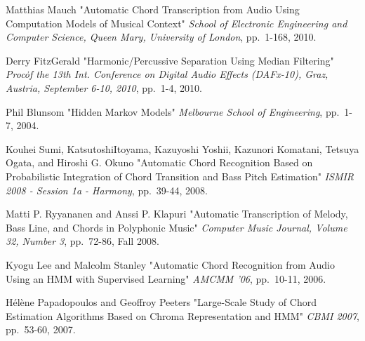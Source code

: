 \documentclass{article}
\begin{document}
\begin{thebibliography}{citations}
Matthias Mauch
"Automatic Chord Transcription from Audio Using Computation Models of Musical Context"
{\it School of Electronic Engineering and Computer Science, Queen Mary, University of London},
pp.~1-168, 2010.

Derry FitzGerald
"Harmonic/Percussive Separation Using Median Filtering"
{\it Proc\. of the 13th Int. Conference on Digital Audio Effects (DAFx-10), Graz, Austria, September 6-10, 2010},
pp.~1-4, 2010.

Phil Blunsom
"Hidden Markov Models"
{\it Melbourne School of Engineering},
pp.~1-7, 2004.

Kouhei Sumi, KatsutoshiItoyama, Kazuyoshi Yoshii, Kazunori Komatani, Tetsuya Ogata, and Hiroshi G. Okuno
"Automatic Chord Recognition Based on Probabilistic Integration of Chord Transition and Bass Pitch Estimation"
{\it ISMIR 2008 - Session 1a - Harmony},
pp.~39-44, 2008.

Matti P. Ryyananen and Anssi P. Klapuri
"Automatic Transcription of Melody, Bass Line, and Chords in Polyphonic Music"
{\it Computer Music Journal, Volume 32, Number 3},
pp.~72-86, Fall 2008.

Kyogu Lee and Malcolm Stanley
"Automatic Chord Recognition from Audio Using an HMM with Supervised Learning"
{\it AMCMM '06},
pp.~10-11, 2006.

Hélène Papadopoulos and Geoffroy Peeters
"Large-Scale Study of Chord Estimation Algorithms Based on Chroma Representation and HMM"
{\it CBMI 2007},
pp.~53-60, 2007.

\end{thebibliography}


\end{document}
